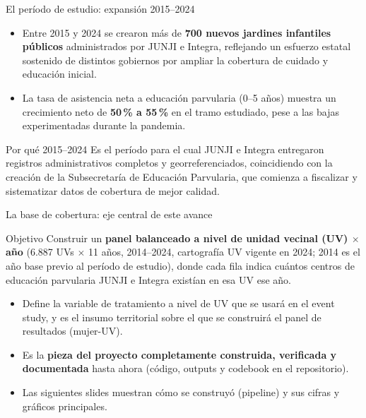 \documentclass[aspectratio=169,10pt]{beamer}
\begin{document}
\begin{frame}{El período de estudio: expansión 2015--2024}
\begin{itemize}
  \item Entre 2015 y 2024 se crearon más de \textbf{700 nuevos jardines infantiles públicos} administrados por JUNJI e Integra, reflejando un esfuerzo estatal sostenido de distintos gobiernos por ampliar la cobertura de cuidado y educación inicial.
  \item La tasa de asistencia neta a educación parvularia (0--5 años) muestra un crecimiento neto de \textbf{50\,\% a 55\,\%} en el tramo estudiado, pese a las bajas experimentadas durante la pandemia.
\end{itemize}

\vspace{8pt}
\begin{block}{Por qué 2015--2024}
\small Es el período para el cual JUNJI e Integra entregaron registros administrativos completos y georreferenciados, coincidiendo con la creación de la Subsecretaría de Educación Parvularia, que comienza a fiscalizar y sistematizar datos de cobertura de mejor calidad.
\end{block}
\end{frame}

\begin{frame}{La base de cobertura: eje central de este avance}
\begin{block}{Objetivo}
\small Construir un \textbf{panel balanceado a nivel de unidad vecinal (UV) $\times$ año} (6.887 UVs $\times$ 11 años, 2014--2024, cartografía UV vigente en 2024; 2014 es el año base previo al período de estudio), donde cada fila indica cuántos centros de educación parvularia JUNJI e Integra existían en esa UV ese año.
\end{block}

\vspace{10pt}
\begin{itemize}
  \item Define la variable de tratamiento a nivel de UV que se usará en el event study, y es el insumo territorial sobre el que se construirá el panel de resultados (mujer-UV).
  \item Es la \textbf{pieza del proyecto completamente construida, verificada y documentada} hasta ahora (código, outputs y codebook en el repositorio).
  \item Las siguientes slides muestran cómo se construyó (pipeline) y sus cifras y gráficos principales.
\end{itemize}
\end{frame}
\end{document}
